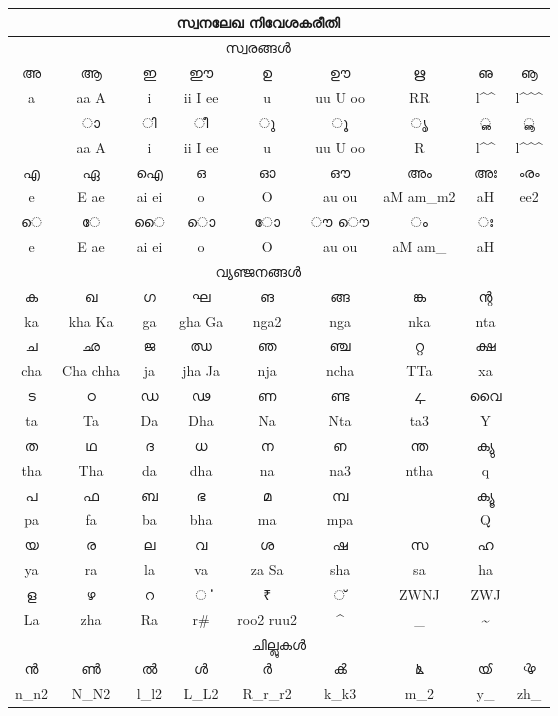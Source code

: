 \documentclass[a4paper]{article}
\makeatletter
\def\en{\color{black!80}\normalsize\En}
\def\mhat{\expandafter\@gobble\string\^}
\def\at{\expandafter\@gobble\string\@}
\def\tldchr{\expandafter\@gobble\string\~}
\def\undchr{\expandafter\@gobble\string\_}
\makeatother
\begin{document}
\Large

\centering

\begin{tabular}{|c|c|c|c|c|c|c|c|c|}
\multicolumn{8}{c}{സ്വനലേഖ നിവേശകരീതി}\\
\hline
\multicolumn{8}{c}{സ്വരങ്ങള്‍}\\
\hline
അ & ആ & ഇ & ഈ & ഉ & ഊ & ഋ & ഌ & ൡ \\
\en a &\en aa A &\en i &\en ii I ee &\en u &\en uu U oo
        &\en RR & \en l\mhat\mhat & \en l\mhat\mhat\mhat \\
\hline
    & ാ & ി & ീ & ു & ൂ & ൃ & ൢ & ൣ \\
\en  &\en \at aa \at A &\en \at i &\en \at ii \at I \at ee &\en \at u &\en \at uu \at U \at oo
        &\en \at R & \en \at l\mhat\mhat &\en  \at l\mhat\mhat\mhat \\
\hline
എ & ഏ & ഐ & ഒ & ഓ & ഔ & അം & അഃ & ൟ \\
\en e &\en E ae &\en ai ei &\en o &\en O &\en au ou &\en aM am\undchr\space m2 &\en aH & \en ee2 \\
\hline
െ & േ & ൈ &ൊ & ോ & ൗ ൌ &ം&  ഃ & \\
\en \at e &\en \at E \at ae &\en \at ai \at ei &\en \at o &\en \at O &\en  \at au  \at ou &\en \at aM am\undchr\space & \en \at aH  & \\
\hline
\multicolumn{8}{c}{വ്യഞ്ജനങ്ങള്‍}\\
\hline
ക & ഖ & ഗ & ഘ & ങ  & ങ്ങ & ങ്ക & ന്റ &\\
\en ka &\en kha Ka &\en ga &\en gha Ga& \en nga2 & \en nga &
 \en nka & \en nta &\\
\hline
ച & ഛ & ജ & ഝ & ഞ & ഞ്ച & റ്റ  & ക്ഷ & \\
\en cha & \en Cha chha &\en ja &\en jha Ja &\en nja &\en ncha & \en TTa &\en xa &\\
\hline
ട & ഠ & ഡ & ഢ & ണ & ണ്ട & ഺ & വൈ &\\
\en ta & \en Ta &\en Da &\en Dha &\en Na & \en Nta & \en ta3 &\en Y &\\
\hline
ത & ഥ & ദ & ധ & ന & ഩ & ന്ത & ക്യു &\\
\en tha &\en Tha &\en da &\en dha & \en na & \en na3 & \en ntha & \en q &\\
\hline
പ & ഫ & ബ & ഭ & മ & മ്പ &  & ക്യൂ  &\\
\en pa&\en fa &\en ba&\en bha & \en ma &\en mpa& & \en Q &\\
\hline
യ & ര & ല & വ & ശ & ഷ & സ & ഹ &\\
\en ya&\en ra&\en la &\en va&\en za Sa&\en sha &\en sa & \en ha &\\
\hline
ള & ഴ & റ & ൎ & ₹ & ്  &\en ZWNJ & \en ZWJ &\\
\en La &\en zha &\en Ra &\en r\# & \en roo2 ruu2 & \mhat & \undchr & \tldchr &\\
\hline
\multicolumn{9}{c}{ചില്ലുകള്‍}\\
\hline
ന്‍ & ണ്‍ & ല്‍ & ള്‍ & ര്‍ & ൿ & ൔ & ൕ & ൖ \\
\en n\undchr \space n2 &\en N\undchr \space N2 &\en l\undchr \space l2 &\en L\undchr \space L2 &\en R\undchr \space r\undchr \space r2
&\en k\undchr \space k3 & \en m\undchr 2 & \en y\undchr & \en zh\undchr \\
\hline
\end{tabular}
\end{document}
